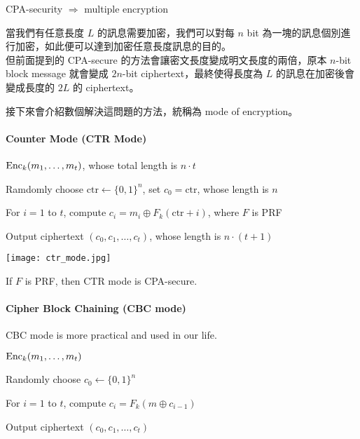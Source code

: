 CPA-security \(\Rightarrow\) multiple encryption

當我們有任意長度 \(L\) 的訊息需要加密，我們可以對每 \(n\) bit 為一塊的訊息個別進行加密，如此便可以達到加密任意長度訊息的目的。 \\
但前面提到的 CPA-secure 的方法會讓密文長度變成明文長度的兩倍，原本 \(n\)-bit block message 就會變成 \(2n\)-bit ciphertext，最終使得長度為 \(L\) 的訊息在加密後會變成長度的 \(2L\) 的 ciphertext。

接下來會介紹數個解決這問題的方法，統稱為 mode of encryption。


\paragraph{Counter Mode (CTR Mode)}

\(\operatorname{Enc}_k(m_1, \ldots, m_t)\), whose total length is \(n \cdot t\)
\begin{myItemize}
	\item Ramdomly choose \(\mathrm{ctr} \leftarrow \{0, 1\}^n\), set \(c_0 = \mathrm{ctr}\), whose length is \(n\)
	\item For \(i = 1\) to \(t\), compute \(c_i = m_i \oplus F_k(\mathrm{ctr} + i)\), where \(F\) is PRF
	\item Output ciphertext \((c_0, c_1, \ldots, c_t)\), whose length is \(n \cdot (t+1)\)
\end{myItemize}
\begin{center}
	\texttt{[image: ctr\_mode.jpg]}
\end{center}

\begin{theorem}
	If \(F\) is PRF, then CTR mode is CPA-secure.
\end{theorem}


\paragraph{Cipher Block Chaining (CBC mode)}

CBC mode is more practical and used in our life.

\(\operatorname{Enc}_k(m_1, \ldots, m_t)\)
\begin{myItemize}
	\item Randomly choose \(c_0 \leftarrow \{0, 1\}^n\)
	\item For \(i = 1\) to \(t\), compute \(c_i = F_k(m \oplus c_{i-1})\)
	\item Output ciphertext \((c_0, c_1, \ldots, c_t)\)
\end{myItemize}

